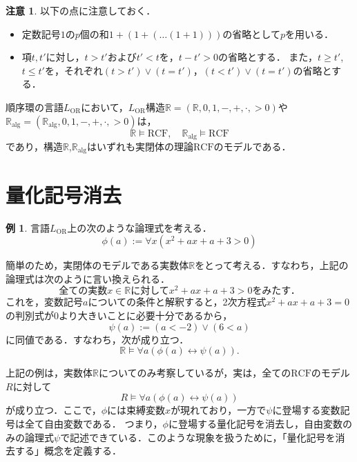 \documentclass[uplatex, dvipdfmx]{jsarticle}
\numberwithin{equation}{section}
\newcommand{\R}{\mathbb{R}}
\newcommand{\Ralg}{\mathbb{R}_\mathrm{alg}}
\newcommand{\RCF}{\mathrm{RCF}}
\theoremstyle{definition}
\newtheorem{remark}[definition]{注意}
\newtheorem{example}[definition]{例}
\begin{document}
\begin{remark}以下の点に注意しておく．
     \begin{itemize}
          \item 
          定数記号$1$の$p$個の和$1+(1 + (\dots (1 + 1)))$の省略として$p$を用いる．
          \item 
          項$t, t'$に対し，$t>t'$および$t'<t$を，$t - t'>0$の省略とする．
          また，$t\geq t'$,$t \leq t'$を，それぞれ$(t>t') \lor (t=t')$，$(t<t') \lor (t=t')$の省略とする．
     \end{itemize}
\end{remark}


順序環の言語$L_{\mathrm{OR}}$において，$L_\mathrm{OR}$構造$\R=(\R,0,1,-,+,\cdot,>0)$や$\Ralg=(\Ralg,0,1,-,+,\cdot,>0)$は，
\begin{equation}
     \R \models \RCF, \quad \Ralg \models \RCF
\end{equation}
であり，構造$\R$,$\Ralg$はいずれも実閉体の理論$\RCF$のモデルである．

\section{量化記号消去}

\begin{example}
     言語$L_\mathrm{OR}$上の次のような論理式を考える．
     \begin{equation}
          \phi(a) := \forall x (x^2 + ax + a + 3 > 0)
     \end{equation}

     簡単のため，実閉体のモデルである実数体$\R$をとって考える．すなわち，上記の論理式は次のように言い換えられる．
     \begin{equation}
          \text{全ての実数$x \in \R$に対して$x^2 + ax + a + 3 > 0$をみたす．}  
     \end{equation}
     これを，変数記号$a$についての条件と解釈すると，2次方程式$x^2 + ax + a + 3 = 0$の判別式が0より大きいことに必要十分であるから，
     \begin{equation}
          \psi(a) := (a < -2) \lor (6 < a)
     \end{equation}
     に同値である．すなわち，次が成り立つ．
     \begin{equation}
          \R \models \forall a (\phi(a) \leftrightarrow \psi(a)).
     \end{equation}
\end{example}

上記の例は，実数体$\R$についてのみ考察しているが，実は，全ての$\RCF$のモデル$R$に対して
\begin{equation}
     R \models \forall a (\phi(a) \leftrightarrow \psi(a))
\end{equation}
が成り立つ．ここで，$\phi$には束縛変数$x$が現れており，一方で$\psi$に登場する変数記号は全て自由変数である．
つまり，$\phi$に登場する量化記号を消去し，自由変数のみの論理式$\psi$で記述できている．このような現象を扱うために，「量化記号を消去する」概念を定義する．
\end{document}

